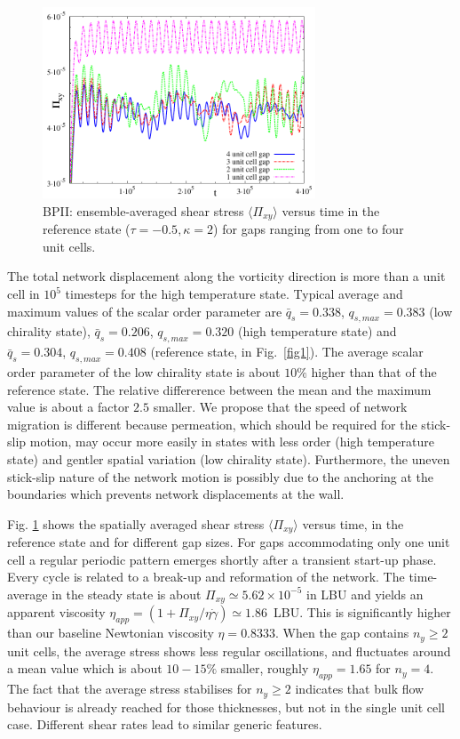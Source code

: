 \documentclass[12pt,twoside]{iopart}
\newcommand{\ex}[1]{\times10^{#1}}
\begin{document}
\begin{figure}[t]
\centering
\includegraphics[width=0.725\textwidth]{stress_bp2_fbc.pdf}
\caption{BPII: ensemble-averaged shear stress $\langle \Pi_{xy}\rangle$
versus time in the reference state ($\tau=-0.5, \kappa=2$) for gaps ranging
from one to four unit cells.}
\label{fig3}
\end{figure}

The total network displacement along the vorticity direction is more than
a unit cell in $10^5$ timesteps for the high temperature state.
Typical average and maximum values of the scalar order parameter are
$\bar{q}_s=0.338$, $q_{s,max}=0.383$ (low chirality state), 
$\bar{q}_s=0.206$, $q_{s,max}=0.320$ (high temperature state) and
$\bar{q}_s=0.304$, $q_{s,max}=0.408$ (reference state, in Fig.~\ref{fig1}).
The average scalar order parameter of the low chirality state is about
$10\%$ higher than that of the reference state. The  relative differerence
between the mean and the maximum value is about a factor $2.5$ smaller.
We propose that the speed of network migration is different because
permeation, which should be required for the stick-slip motion, may occur
more easily in states with less order (high temperature state) and gentler
spatial variation (low chirality state). Furthermore, the uneven stick-slip
nature of the network motion is possibly due to the anchoring at the
boundaries which prevents network displacements at the wall. 

Fig. \ref{fig3} shows the spatially averaged shear stress $\langle \Pi_{xy}\rangle$ versus time, in the reference state and for different gap sizes.
For gaps accommodating only one unit cell a regular periodic pattern emerges shortly after a transient start-up phase.
Every cycle is related to a break-up and reformation of the network.
The time-average in the steady state is about $\Pi_{xy}\simeq5.62\ex{-5}$
in LBU and yields an apparent viscosity
$\eta_{app}=(1 +\Pi_{xy}/\eta\dot{\gamma})\simeq 1.86$~LBU. This is
significantly higher than our baseline Newtonian viscosity $\eta = 0.8333$.
When the gap contains $n_y\ge2$ unit cells, the average stress shows
less regular oscillations, and fluctuates around a mean value which is
about $10-15\%$ smaller, roughly $\eta_{app}=1.65$ for $n_y=4$. The fact
that the average stress stabilises for $n_y\ge2$ indicates that bulk flow
behaviour is already reached for those thicknesses, but not in the single
unit cell case. Different shear rates lead to similar generic features.
\end{document}
